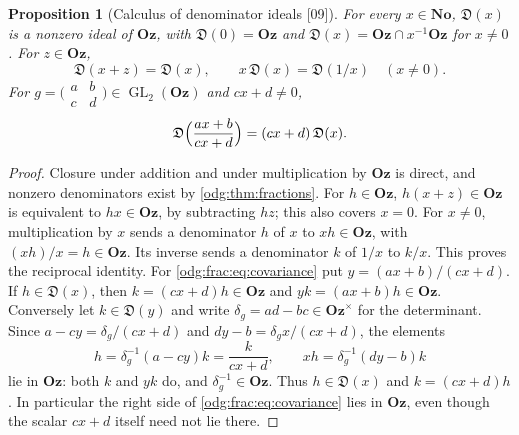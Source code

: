 \documentclass[11pt,oneside]{article}
\numberwithin{equation}{section}
\newtheorem{proposition}[proposition]{Proposition}
\theoremstyle{definition}
\theoremstyle{remark}
\newcommand{\No}{\mathbf{No}}
\newcommand{\Oz}{\mathbf{Oz}}
\newcommand{\GL}{\operatorname{GL}}
\newcommand{\src}[1]{\textup{\textsf{\small[#1]}}}
\newcommand{\Den}{\mathfrak D}
\begin{document}
\begin{proposition}[Calculus of denominator ideals \src{09}]\label{odg:frac:prop:calculus}
For every $x\in\No$, $\Den(x)$ is a nonzero ideal of $\Oz$, with
$\Den(0)=\Oz$ and $\Den(x)=\Oz\cap x^{-1}\Oz$ for $x\ne0$. For $z\in\Oz$,
\[
 \Den(x+z)=\Den(x),\qquad x\,\Den(x)=\Den(1/x)\quad(x\ne0).
\]
For $g=\bigl(\begin{smallmatrix}a&b\\c&d\end{smallmatrix}\bigr)\in\GL_2(\Oz)$ and
$cx+d\ne0$,
\begin{equation}\label{odg:frac:eq:covariance}
 \Den\Bigl(\frac{ax+b}{cx+d}\Bigr)=(cx+d)\,\Den(x).
\end{equation}
\end{proposition}
\begin{proof}
Closure under addition and under multiplication by $\Oz$ is direct, and
nonzero denominators exist by \cref{odg:thm:fractions}. For $h\in\Oz$,
$h(x+z)\in\Oz$ is equivalent to $hx\in\Oz$, by subtracting $hz$; this also
covers $x=0$. For $x\ne0$, multiplication by $x$ sends a denominator $h$ of
$x$ to $xh\in\Oz$, with $(xh)/x=h\in\Oz$. Its inverse sends a denominator
$k$ of $1/x$ to $k/x$. This proves the reciprocal identity.
For \eqref{odg:frac:eq:covariance} put
$y=(ax+b)/(cx+d)$. If $h\in\Den(x)$, then $k=(cx+d)h\in\Oz$ and
$yk=(ax+b)h\in\Oz$. Conversely let $k\in\Den(y)$ and write
$\delta_g=ad-bc\in\Oz^\times$ for the determinant. Since
$a-cy=\delta_g/(cx+d)$ and $dy-b=\delta_g x/(cx+d)$, the elements
\[
 h=\delta_g^{-1}(a-cy)k=\frac{k}{cx+d},\qquad
 xh=\delta_g^{-1}(dy-b)k
\]
lie in $\Oz$: both $k$ and $yk$ do, and $\delta_g^{-1}\in\Oz$.
Thus $h\in\Den(x)$ and $k=(cx+d)h$. In particular the right side of
\eqref{odg:frac:eq:covariance} lies in $\Oz$, even though the scalar
$cx+d$ itself need not lie there.
\end{proof}
\end{document}
